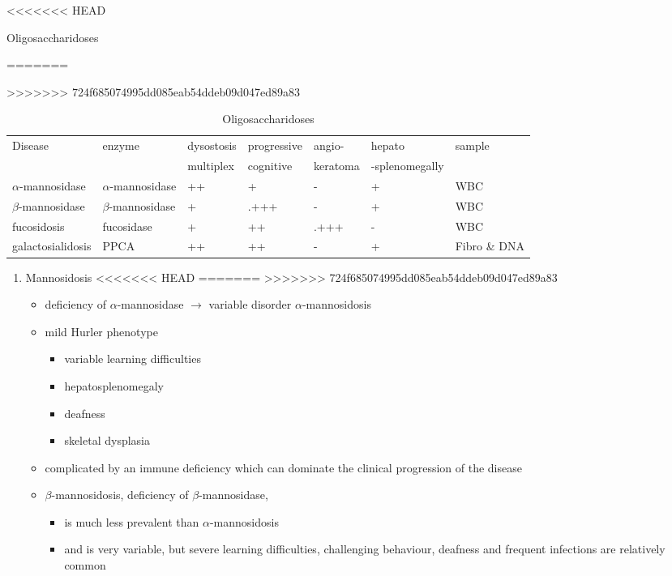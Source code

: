 \documentclass[fontsize=12pt]{scrartcl}
\begin{document}
\begin{enumerate}
\begin{enumerate}
\begin{enumerate}
\begin{enumerate}
\begin{table}[htbp]
\begin{enumerate}
\begin{enumerate}
\begin{enumerate}
\begin{enumerate}
\begin{enumerate}
\begin{itemize}
\begin{enumerate}
\begin{table}[htbp]
<<<<<<< HEAD
\caption{\label{tab:org67911d1}Oligosaccharidoses}
=======
\caption{\label{tab:org71ebf21}
Oligosaccharidoses}
>>>>>>> 724f685074995dd085eab54ddeb09d047ed89a83
\centering
\begin{tabular}{lllllll}
Disease & enzyme & dysostosis & progressive & angio- & hepato & sample\\
 &  & multiplex & cognitive & keratoma & -splenomegally & \\
\hline
\(\alpha\)-mannosidase & \(\alpha\)-mannosidase & ++ & + & - & + & WBC\\
\(\beta\)-mannosidase & \(\beta\)-mannosidase & + & .+++ & - & + & WBC\\
fucosidosis & fucosidase & + & ++ & .+++ & - & WBC\\
galactosialidosis & PPCA & ++ & ++ & - & + & Fibro \& DNA\\
\end{tabular}
\end{table}

\begin{enumerate}
\item Mannosidosis
<<<<<<< HEAD
\label{sec:org5140cb4}
=======
\label{sec:org39fa5f3}
>>>>>>> 724f685074995dd085eab54ddeb09d047ed89a83
\begin{itemize}
\item deficiency of \(\alpha\)-mannosidase \(\to\) variable disorder \(\alpha\)-mannosidosis
\item mild Hurler phenotype
\begin{itemize}
\item variable learning difficulties
\item hepatosplenomegaly
\item deafness
\item skeletal dysplasia
\end{itemize}
\item complicated by an immune deficiency which can dominate the clinical
progression of the disease

\item \(\beta\)-mannosidosis, deficiency of \(\beta\)-mannosidase,
\begin{itemize}
\item is much less prevalent than \(\alpha\)-mannosidosis
\item and is very variable, but severe learning difficulties,
challenging behaviour, deafness and frequent infections are
relatively common
\end{itemize}
\end{itemize}


\end{enumerate}
\end{enumerate}
\end{itemize}
\end{enumerate}
\end{enumerate}
\end{enumerate}
\end{enumerate}
\end{enumerate}
\end{table}
\end{enumerate}
\end{enumerate}
\end{enumerate}
\end{enumerate}
\end{document}
